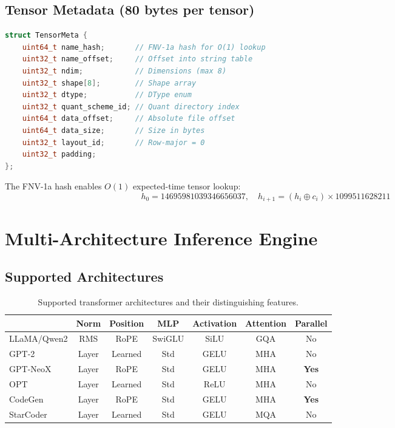 \documentclass[12pt,a4paper]{article}
\begin{document}
\subsection{Tensor Metadata (80 bytes per tensor)}

\begin{lstlisting}[language=C++, caption={Tensor metadata entry.}]
struct TensorMeta {
    uint64_t name_hash;       // FNV-1a hash for O(1) lookup
    uint32_t name_offset;     // Offset into string table
    uint32_t ndim;            // Dimensions (max 8)
    uint32_t shape[8];        // Shape array
    uint32_t dtype;           // DType enum
    uint32_t quant_scheme_id; // Quant directory index
    uint64_t data_offset;     // Absolute file offset
    uint64_t data_size;       // Size in bytes
    uint32_t layout_id;       // Row-major = 0
    uint32_t padding;
};
\end{lstlisting}

The FNV-1a hash \citep{fnv1a} enables $O(1)$ expected-time tensor lookup:
\begin{equation}
h_0 = 14695981039346656037, \quad h_{i+1} = (h_i \oplus c_i) \times 1099511628211
\label{eq:fnv1a}
\end{equation}

\section{Multi-Architecture Inference Engine}
\label{sec:engine}

\subsection{Supported Architectures}

\begin{table}[H]
\centering
\caption{Supported transformer architectures and their distinguishing features.}
\label{tab:arch}
\begin{tabular}{@{}lcccccc@{}}
\toprule
& \textbf{Norm} & \textbf{Position} & \textbf{MLP} & \textbf{Activation} & \textbf{Attention} & \textbf{Parallel} \\
\midrule
LLaMA/Qwen2 & RMS & RoPE & SwiGLU & SiLU & GQA & No \\
GPT-2 & Layer & Learned & Std & GELU & MHA & No \\
GPT-NeoX & Layer & RoPE & Std & GELU & MHA & \textbf{Yes} \\
OPT & Layer & Learned & Std & ReLU & MHA & No \\
CodeGen & Layer & RoPE & Std & GELU & MHA & \textbf{Yes} \\
StarCoder & Layer & Learned & Std & GELU & MQA & No \\
\bottomrule
\end{tabular}
\end{table}
\end{document}
